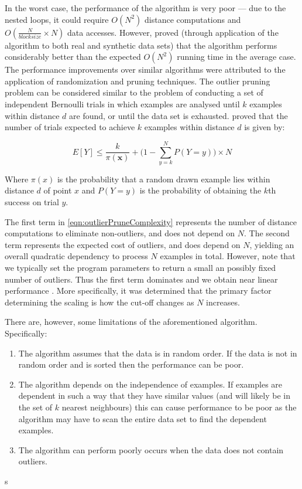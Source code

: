 In the worst case, the performance of the algorithm is very poor --- due to the
nested loops, it could require $O(N^{2})$ distance computations and
$O(\frac{N}{blocksize} \times N)$ data accesses. However, \citeauthor{Bay:2003}
proved (through application of the algorithm to both real and synthetic data
sets) that the algorithm performs considerably better than the expected
$O(N^{2})$ running time in the average case. The performance improvements over
similar algorithms were attributed to the application of randomization and
pruning techniques. The outlier pruning problem can be considered similar to the
problem of conducting a set of independent Bernoulli trials in which examples
are analysed until $k$ examples within distance $d$ are found, or until the data
set is exhausted. \citeauthor{Bay:2003} proved that the number of trials
expected to achieve $k$ examples within distance $d$ is given by:

\begin{equation}
    E[Y] \leq \frac{k}{\pi(\textbf{x})} + \Bigg(1-\sum_{y=k}^{N} P(Y=y)\Bigg) \times N
    \label{eqn:outlierPruneComplexity}
\end{equation}

Where $\pi(x)$ is the probability that a random drawn example lies within
distance $d$ of point $x$ and $P(Y=y)$ is the probability of obtaining the $k$th
success on trial $y$.

The first term in \autoref{eqn:outlierPruneComplexity} represents the number of
distance computations to eliminate non-outliers, and does not depend on $N$. The
second term represents the expected cost of outliers, and does depend on $N$,
yielding an overall quadratic dependency to process $N$ examples in total.
However, note that we typically set the program parameters to return a small an
possibly fixed number of outliers. Thus the first term dominates and we obtain
near linear performance \cite{Bay:2003}. More specifically, it was determined
that the primary factor determining the scaling is how the cut-off changes as
$N$ increases.

There are, however, some limitations of the aforementioned algorithm.
Specifically:
\begin{enumerate}
    \item The algorithm assumes that the data is in random order. If the data is
        not in random order and is sorted then the performance can be poor.
    \item The algorithm depends on the independence of examples. If examples are
        dependent in such a way that they have similar values (and will likely
        be in the set of $k$ nearest neighbours) this can cause performance to
        be poor as the algorithm may have to scan the entire data set to find
        the dependent examples.
    \item The algorithm can perform poorly occurs when the data does not contain
        outliers.
\end{enumerate}s